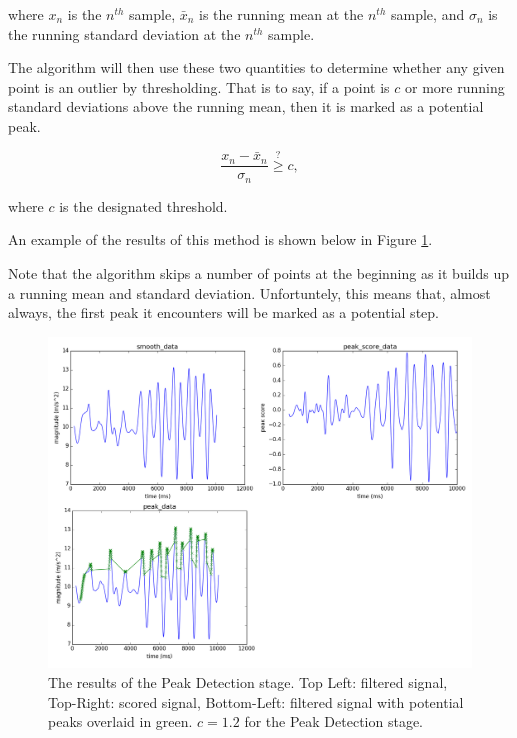             where $x_n$ is the $n^{th}$ sample, $\bar{x}_n$ is the running mean at the $n^{th}$ sample, and $\sigma_n$ is the running standard deviation at the $n^{th}$ sample.

            The algorithm will then use these two quantities to determine whether any given point is an outlier by thresholding. That is to say, if a point is $c$ or more running standard deviations above the running mean, then it is marked as a potential peak.

            \begin{equation}
                \frac{x_n - \bar{x}_n}{\sigma_n} \stackrel{?}{\geq} c,
            \end{equation}

            where $c$ is the designated threshold.

            An example of the results of this method is shown below in Figure \ref{img_detection_stage}.

            Note that the algorithm skips a number of points at the beginning as it builds up a running mean and standard deviation. Unfortuntely, this means that, almost always, the first peak it encounters will be marked as a potential step.

            \begin{figure}[!th]
                \includegraphics[width=\textwidth]{Images/detection_stage.png}
                \centering
                \caption{The results of the Peak Detection stage. Top Left: filtered signal, Top-Right: scored signal, Bottom-Left: filtered signal with potential peaks overlaid in green. $c=1.2$ for the Peak Detection stage.}
                \label{img_detection_stage}
            \end{figure}

